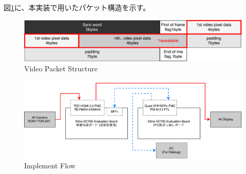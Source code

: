 図\ref{fig:fpga-video-packet}に、本実装で用いたパケット構造を示す。

\begin{figure}[htbp]
    \begin{center}
        \includegraphics[bb=0 0 643 122,width=15.5cm]{img/fpga-video-packet.pdf}
    \end{center}
    \caption{Video Packet Structure}
    \label{fig:fpga-video-packet}
\end{figure}

\begin{figure}[htbp]
    \begin{center}
        \includegraphics[bb=0 0 841 299,width=15.5cm]{img/fpga-implement-flow.pdf}
    \end{center}
    \caption{Implement Flow}
    \label{fig:fpga-implement-flow}
\end{figure}
